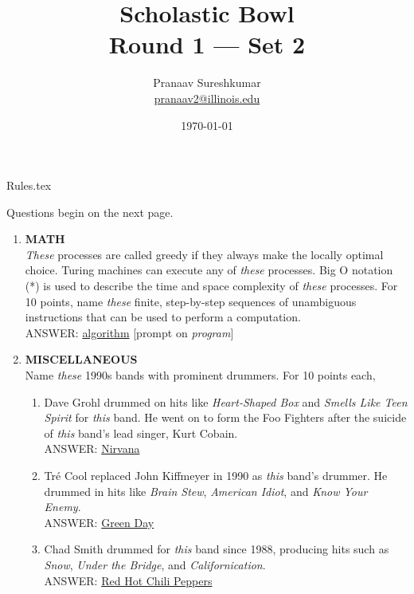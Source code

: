 \documentclass{report}
\title{\textbf{Scholastic Bowl} \\ Round 1 --- Set 2}
\author{Pranaav Sureshkumar \\ \href{mailto:pranaav2@illinois.edu}{pranaav2@illinois.edu}}
\date{\today}
\newcommand*{\backtrack}{\setcounter{enumi}{\numexpr\theenumi-1\relax}}
\begin{document}


\maketitle

{Rules.tex}

\newpage

\vspace*{\fill}
\centering
\thispagestyle{empty}
\Large
Questions begin on the next page.
\vspace*{\fill}

\normalsize
\newpage
\setcounter{page}{1}

\begin{enumerate}
    \item \textbf{MATH} \\ \textit{These} processes are called greedy if they always make the locally optimal choice. Turing machines can execute any of \textit{these} processes. Big O notation (*) is used to describe the time and space complexity of \textit{these} processes. For 10 points, name \textit{these} finite, step-by-step sequences of unambiguous instructions that can be used to perform a computation. \\ ANSWER: \underline{algorithm} [prompt on \textit{program}] \backtrack
    \item \textbf{MISCELLANEOUS} \\ Name \textit{these} 1990s bands with prominent drummers. For 10 points each,
    \begin{enumerate}[label=\Alph*]
        \item Dave Grohl drummed on hits like \textit{Heart-Shaped Box} and \textit{Smells Like Teen Spirit} for \textit{this} band. He went on to form the Foo Fighters after the suicide of \textit{this} band’s lead singer, Kurt Cobain. \\ ANSWER: \underline{Nirvana}
        \item Tré Cool replaced John Kiffmeyer in 1990 as \textit{this} band's drummer. He drummed in hits like \textit{Brain Stew}, \textit{American Idiot}, and \textit{Know Your Enemy}. \\ ANSWER: \underline{Green Day}
        \item Chad Smith drummed for \textit{this} band since 1988, producing hits such as \textit{Snow}, \textit{Under the Bridge}, and \textit{Californication}. \\ ANSWER: \underline{Red Hot Chili Peppers}
    \end{enumerate}


\end{enumerate}
\end{document}
